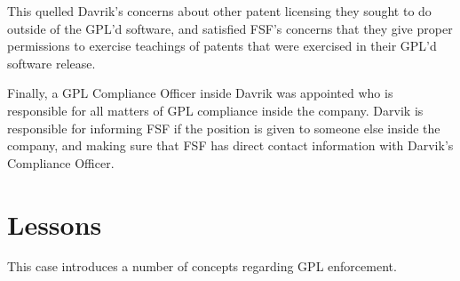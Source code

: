 \documentclass[12pt]{report}
\begin{document}
This quelled Davrik's concerns about other patent licensing they sought to
do outside of the GPL'd software, and satisfied FSF's concerns that they
give proper permissions to exercise teachings of patents that were
exercised in their GPL'd software release.

Finally, a GPL Compliance Officer inside Davrik was appointed who is
responsible for all matters of GPL compliance inside the company.  Darvik
is responsible for informing FSF if the position is given to someone else
inside the company, and making sure that FSF has direct contact
information with Darvik's Compliance Officer.

\section{Lessons}

This case introduces a number of concepts regarding GPL enforcement.
\end{document}
